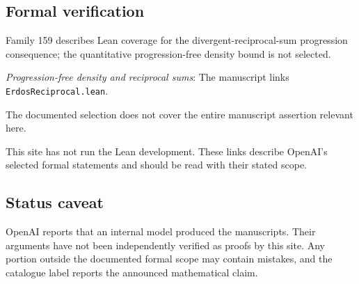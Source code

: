 \documentclass[11pt]{article}
\begin{document}
\subsection{Formal verification}
Family 159 describes Lean coverage for the divergent-reciprocal-sum progression consequence; the quantitative progression-free density bound is not selected.

\textit{Progression-free density and reciprocal sums}: The manuscript links \texttt{ErdosReciprocal.lean}.

The documented selection does not cover the entire manuscript assertion relevant here.

This site has not run the Lean development. These links describe OpenAI’s selected formal statements and should be read with their stated scope.

\subsection{Status caveat}
OpenAI reports that an internal model produced the manuscripts. Their arguments have not been independently verified as proofs by this site. Any portion outside the documented formal scope may contain mistakes, and the catalogue label reports the announced mathematical claim.
\end{document}
